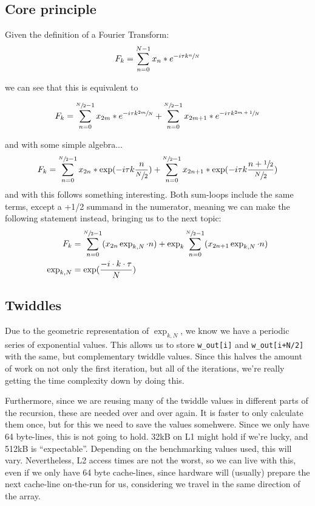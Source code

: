 \documentclass{../../../myassignment}
\begin{document}
	\subsection*{Core principle}
	Given the definition of a Fourier Transform: 
	$$ 
		F_k = \sum_{n=0}^{N-1} x_n * e^{-i\tau k \sfrac{n}{N}}
	$$

	we can see that this is equivalent to

	$$
		F_k = \sum_{n=0}^{\sfrac{N}{2}-1} x_{2m} * e^{-i\tau k \sfrac{2m}{N}} +  \sum_{n=0}^{\sfrac{N}{2}-1} x_{2m+1} * e^{-i\tau k \sfrac{2m+1}{N}}
	$$

	and with some simple algebra...
	$$
		F_k = \sum_{n=0}^{\sfrac{N}{2}-1} x_{2n} * \exp({-i\tau k \frac{n}{\sfrac{N}{2}}}) +  \sum_{n=0}^{\sfrac{N}{2}-1} x_{2n+1} * \exp({-i\tau k \frac{n+\sfrac{1}{2}}{\sfrac{N}{2}}})
	$$
	and with this follows something interesting. Both sum-loops include the same terms, except a +1/2 summand in the numerator, meaning we can make the following statement instead, bringing us to the next topic:
	\begin{align*}
		F_k &= \sum_{n=0}^{\sfrac{N}{2}-1} (x_{2n}\exp_{k,N}\cdot n) + \exp_k \sum_{n=0}^{\sfrac{N}{2}-1} (x_{2n+1}\exp_{k,N}\cdot n) \\
		\exp_{k,N} &= \exp(\frac{-i\cdot k\cdot\tau}{N})
	\end{align*}


	\subsection*{Twiddles}
	Due to the geometric representation of $\exp_{k,N}$, we know we have a periodic series of exponential values. This allows us to store \texttt{w\_out[i]} and \texttt{w\_out[i+N/2]} with the same, but complementary twiddle values. Since this halves the amount of work on not only the first iteration, but all of the iterations, we're really getting the time complexity down by doing this.
	
	Furthermore, since we are reusing many of the twiddle values in different parts of the recursion, these are needed over and over again. It is faster to only calculate them once, but for this we need to save the values somehwere. Since we only have 64 byte-lines, this is not going to hold. 32kB on L1 might hold if we're lucky, and 512kB is ``expectable''. Depending on the benchmarking values used, this will vary. Nevertheless, L2 access times are not the worst, so we can live with this, even if we only have 64 byte cache-lines, since hardware will (usually) prepare the next cache-line on-the-run for us, considering we travel in the same direction of the array. 
\end{document}
